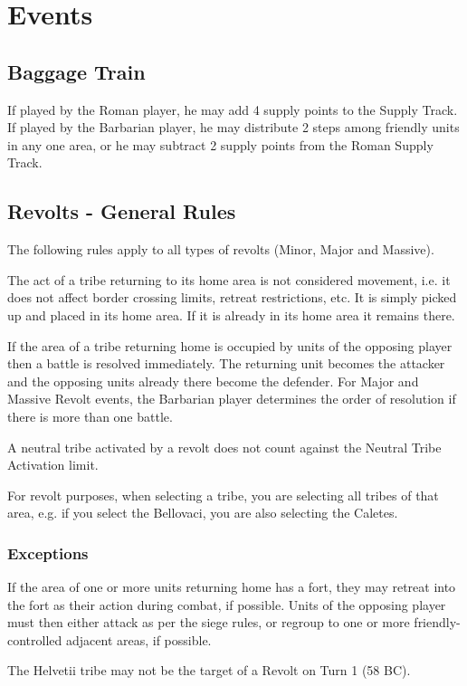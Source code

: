 \clearpage
\section{Events}
\subsection{Baggage Train}
If played by the Roman player, he may add 4 supply points to the
Supply Track. If played by the Barbarian player, he may distribute
2 steps among friendly units in any one area, or he may subtract 2
supply points from the Roman Supply Track.

\subsection{Revolts - General Rules}
The following rules apply to all types of revolts (Minor, Major and Massive).

The act of a tribe returning to its home area is not considered movement, i.e. it does not affect border crossing limits, retreat restrictions, etc. It is simply picked up and placed in its home area. If it is already in its home area it remains there.

If the area of a tribe returning home is occupied by units of the opposing player then a battle is resolved immediately. The returning unit becomes the attacker and the opposing units already there become the defender. For Major and Massive Revolt events, the Barbarian player determines the order of resolution if there is more than one battle.

A neutral tribe activated by a revolt does not count against the Neutral Tribe Activation limit.

For revolt purposes, when selecting a tribe, you are selecting all tribes of that area, e.g. if you select the Bellovaci, you are also selecting the Caletes.

\subsubsection{Exceptions}

If the area of one or more units returning home has a fort, they may retreat into the fort as their action during combat, if possible. Units of the opposing player must then either attack as per the siege rules, or regroup to one or more friendly-controlled adjacent areas, if possible.

The Helvetii tribe may not be the target of a Revolt on Turn 1 (58 BC).

